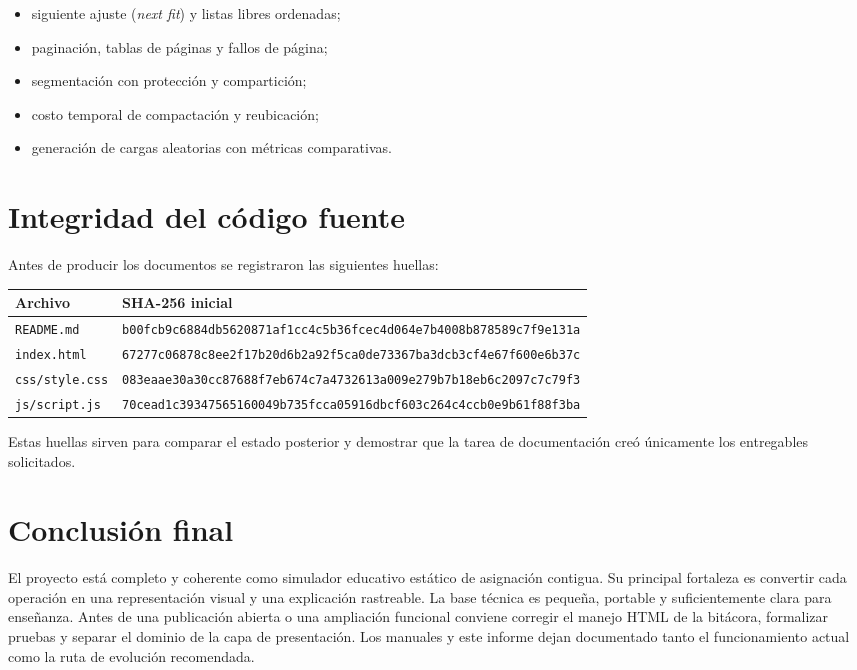 \documentclass[11pt,a4paper]{article}
\newcommand{\archivo}[1]{\texttt{#1}}
\begin{document}
\begin{itemize}
  \item siguiente ajuste (\emph{next fit}) y listas libres ordenadas;
  \item paginación, tablas de páginas y fallos de página;
  \item segmentación con protección y compartición;
  \item costo temporal de compactación y reubicación;
  \item generación de cargas aleatorias con métricas comparativas.
\end{itemize}

\section{Integridad del código fuente}

Antes de producir los documentos se registraron las siguientes huellas:

\begin{longtable}{p{}p{}}
\toprule
\textbf{Archivo} & \textbf{SHA-256 inicial}\\
\midrule
\endhead
\archivo{README.md} & \texttt{b00fcb9c6884db5620871af1cc4c5b36}\allowbreak\texttt{fcec4d064e7b4008b878589c7f9e131a}\\
\archivo{index.html} & \texttt{67277c06878c8ee2f17b20d6b2a92f5c}\allowbreak\texttt{a0de73367ba3dcb3cf4e67f600e6b37c}\\
\archivo{css/style.css} & \texttt{083eaae30a30cc87688f7eb674c7a4732}\allowbreak\texttt{613a009e279b7b18eb6c2097c7c79f3}\\
\archivo{js/script.js} & \texttt{70cead1c39347565160049b735fcca059}\allowbreak\texttt{16dbcf603c264c4ccb0e9b61f88f3ba}\\
\bottomrule
\end{longtable}

Estas huellas sirven para comparar el estado posterior y demostrar que la tarea de
documentación creó únicamente los entregables solicitados.

\section{Conclusión final}

\begin{conclusionbox}
El proyecto está completo y coherente como simulador educativo estático de
asignación contigua. Su principal fortaleza es convertir cada operación en una
representación visual y una explicación rastreable. La base técnica es pequeña,
portable y suficientemente clara para enseñanza. Antes de una publicación abierta
o una ampliación funcional conviene corregir el manejo HTML de la bitácora,
formalizar pruebas y separar el dominio de la capa de presentación. Los manuales y
este informe dejan documentado tanto el funcionamiento actual como la ruta de
evolución recomendada.
\end{conclusionbox}
\end{document}
